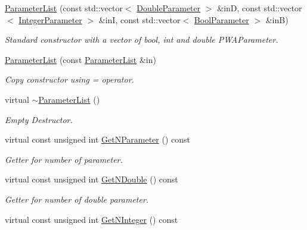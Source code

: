\begin{DoxyCompactItemize}
\hyperlink{class_parameter_list_ad66b91346d298714c5200ffe658d841c}{Parameter\-List} (const std\-::vector$<$ \hyperlink{class_double_parameter}{Double\-Parameter} $>$ \&in\-D, const std\-::vector$<$ \hyperlink{class_integer_parameter}{Integer\-Parameter} $>$ \&in\-I, const std\-::vector$<$ \hyperlink{class_bool_parameter}{Bool\-Parameter} $>$ \&in\-B)
\begin{DoxyCompactList}\small\item\em Standard constructor with a vector of bool, int and double P\-W\-A\-Parameter. \end{DoxyCompactList}\item 
\hyperlink{class_parameter_list_a93bfa4961eab456b33f0009e7a5ab1bb}{Parameter\-List} (const \hyperlink{class_parameter_list}{Parameter\-List} \&in)
\begin{DoxyCompactList}\small\item\em Copy constructor using = operator. \end{DoxyCompactList}\item 
virtual \hyperlink{class_parameter_list_ad3184442bd4735ef5afbb8f7cd7b8726}{$\sim$\-Parameter\-List} ()
\begin{DoxyCompactList}\small\item\em Empty Destructor. \end{DoxyCompactList}\item 
\hypertarget{class_parameter_list_a3f27ba4154586dfb2d4c4c30d576219c}{virtual const unsigned int \hyperlink{class_parameter_list_a3f27ba4154586dfb2d4c4c30d576219c}{Get\-N\-Parameter} () const }\label{class_parameter_list_a3f27ba4154586dfb2d4c4c30d576219c}

\begin{DoxyCompactList}\small\item\em Getter for number of parameter. \end{DoxyCompactList}\item 
\hypertarget{class_parameter_list_aa626799b903b16e7f6f29f918c626f9e}{virtual const unsigned int \hyperlink{class_parameter_list_aa626799b903b16e7f6f29f918c626f9e}{Get\-N\-Double} () const }\label{class_parameter_list_aa626799b903b16e7f6f29f918c626f9e}

\begin{DoxyCompactList}\small\item\em Getter for number of double parameter. \end{DoxyCompactList}\item 
\hypertarget{class_parameter_list_a8f9f2b28594a1055ea5f8e920ebcbff7}{virtual const unsigned int \hyperlink{class_parameter_list_a8f9f2b28594a1055ea5f8e920ebcbff7}{Get\-N\-Integer} () const }\label{class_parameter_list_a8f9f2b28594a1055ea5f8e920ebcbff7}


\end{DoxyCompactItemize}
